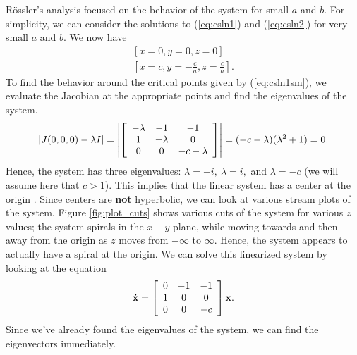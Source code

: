 \documentclass{article}
\begin{document}
R\"{o}ssler's analysis focused on the behavior of the system for small $a$ and $b$. For simplicity, we can consider the solutions to (\ref{eq:csln1}) and (\ref{eq:csln2}) for very small $a$ and $b$. We now have
\begin{gather}
	\left[
	x=0,
	y=0,
	z=0
	\right]\label{eq:csln1sm}\\
	\left[
	x=c,
	y=-\frac{c}{a},
	z=\frac{c}{a}
	\right]\label{eq:csln2sm}.
\end{gather}
To find the behavior around the critical points given by (\ref{eq:csln1sm}), we evaluate the Jacobian at the appropriate points and find the eigenvalues of the system.
\[
	|J(0,0,0)-\lambda I| =
	\left|
	\left[
	\begin{array}{c c c}
		-\lambda & -1       & -1         \\
		1        & -\lambda & 0          \\
		0        & 0        & -c-\lambda
	\end{array}
	\right]
	\right| =
	(-c-\lambda)(\lambda^{2} + 1)=0.
\]
Hence, the system has three eigenvalues: $\lambda=-i,\ \lambda=i,$ and $\lambda = -c$ (we will assume here that $c > 1$). This implies that the linear system has a center at the origin \cite{equilibria}. Since centers are \textbf{not} hyperbolic, we can look at various stream plots of the system. Figure \ref{fig:plot_cuts} shows various cuts of the system for various $z$ values; the system spirals in the $x-y$ plane, while moving towards and then away from the origin as $z$ moves from $-\infty$ to $\infty$. Hence, the system appears to actually have a spiral at the origin. We can solve this linearized system by looking at the equation
\[
	\mathbf{\dot{x}} =
	\left[
	\begin{array}{c c c}
		0 & -1 & -1 \\
		1 & 0  & 0  \\
		0 & 0  & -c
	\end{array}
	\right]
	\mathbf{x}.
\]
Since we've already found the eigenvalues of the system, we can find the eigenvectors immediately.
\end{document}

